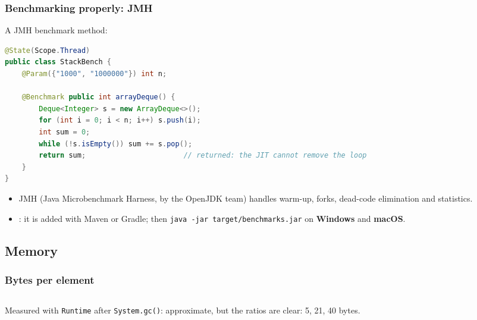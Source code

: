 \documentclass[aspectratio=169,10pt,compress]{beamer}
\newcommand{\win}{\textbf{Windows}}
\newcommand{\mac}{\textbf{macOS}}
\begin{document}
\begin{frame}[t,fragile] \frametitle{Benchmarking properly: JMH}
  \small A JMH benchmark method:


\begin{lstlisting}[style=codesnippet, language=Java, basicstyle=\ttfamily\scriptsize]
@State(Scope.Thread)
public class StackBench {
    @Param({"1000", "1000000"}) int n;

    @Benchmark public int arrayDeque() {
        Deque<Integer> s = new ArrayDeque<>();
        for (int i = 0; i < n; i++) s.push(i);
        int sum = 0;
        while (!s.isEmpty()) sum += s.pop();
        return sum;                       // returned: the JIT cannot remove the loop
    }
}
\end{lstlisting}


  \begin{itemize}\small
    \item JMH (Java Microbenchmark Harness, by the OpenJDK team) handles warm-up, forks, dead-code elimination and statistics.
    \item {}: it is added with Maven or Gradle; then \texttt{java -jar target/benchmarks.jar} on \win{} and \mac.
  \end{itemize}
\end{frame}

\subsection[Memory]{Memory}




\begin{frame}[t,fragile] \frametitle{Bytes per element}
  \begin{columns}[T]
    \begin{column}{0.49\textwidth}
    \end{column}
    \begin{column}{0.49\textwidth}
    \end{column}
  \end{columns}
  \small Measured with \texttt{Runtime} after \texttt{System.gc()}: approximate, but the ratios are clear: 5, 21, 40 bytes.
\end{frame}
\end{document}
